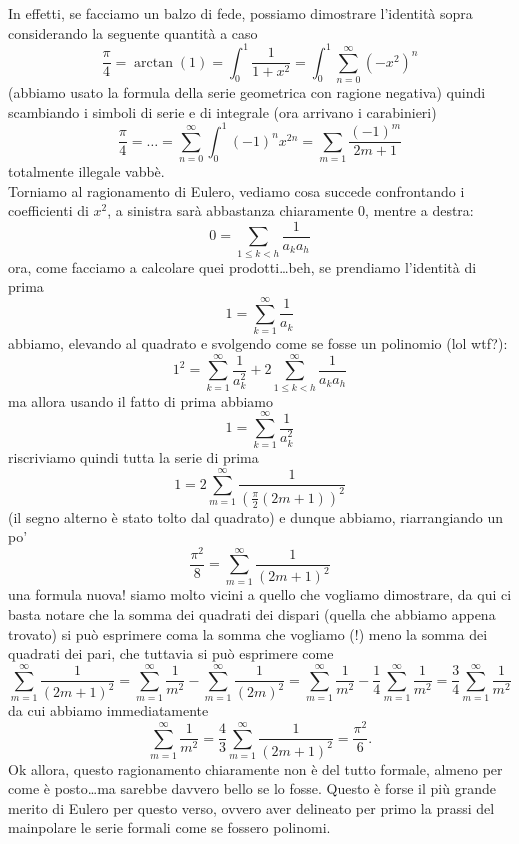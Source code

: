 \documentclass[11pt]{scrartcl}
\begin{document}
  In effetti, se facciamo un balzo di fede, possiamo dimostrare l'identità sopra considerando la seguente quantità a caso
  $$\frac{\pi}{4}=\arctan(1)=\int_0^1\frac{1}{1+x^2}=\int_0^1\sum_{n=0}^\infty(-x^2)^n$$ 
  (abbiamo usato la formula della serie geometrica con ragione negativa) quindi scambiando i simboli di serie e di integrale (ora arrivano i carabinieri)
  $$\frac{\pi}{4}=\dots=\sum_{n=0}^\infty\int_0^1(-1)^nx^{2n}=\sum_{m=1}\frac{(-1)^m}{2m+1}$$
  totalmente illegale vabbè. \\
  Torniamo al ragionamento di Eulero, vediamo cosa succede confrontando i coefficienti di $x^2$, a sinistra sarà abbastanza chiaramente $0$, mentre a destra:
  $$0=\sum_{1\le k<h}\frac{1}{a_ka_h}$$
  ora, come facciamo a calcolare quei prodotti\dots beh, se prendiamo l'identità di prima
  $$1=\sum_{k=1}^\infty\frac{1}{a_k}$$
  abbiamo, elevando al quadrato e svolgendo come se fosse un polinomio (lol wtf?):
  $$1^2=\sum_{k=1}^\infty\frac{1}{a_k^2}+2\sum_{1\le k < h}^\infty \frac{1}{a_ka_h}$$
  ma allora usando il fatto di prima abbiamo 
  $$1=\sum_{k=1}^\infty\frac{1}{a_k^2}$$
  riscriviamo quindi tutta la serie di prima
  $$1=2\sum_{m=1}^\infty\frac{1}{\left(\frac{\pi}{2}(2m+1)\right)^2}$$
  (il segno alterno è stato tolto dal quadrato) e dunque abbiamo, riarrangiando un po'
  $$\frac{\pi^2}{8}=\sum_{m=1}^\infty\frac{1}{(2m+1)^2}$$
  una formula nuova! siamo molto vicini a quello che vogliamo dimostrare, da qui ci basta notare che la somma dei quadrati dei dispari (quella che abbiamo appena trovato) si può esprimere coma la somma che vogliamo (!) meno la somma dei quadrati dei pari, che tuttavia si può esprimere come
  $$\sum_{m=1}^\infty\frac{1}{(2m+1)^2}=\sum_{m=1}^\infty \frac{1}{m^2}-\sum_{m=1}^\infty \frac{1}{(2m)^2}=\sum_{m=1}^\infty \frac{1}{m^2}-\frac{1}{4}\sum_{m=1}^\infty \frac{1}{m^2}=\frac{3}{4}\sum_{m=1}^\infty \frac{1}{m^2}$$
  da cui abbiamo immediatamente
  $$\sum_{m=1}^\infty \frac{1}{m^2}=\frac{4}{3}\sum_{m=1}^\infty\frac{1}{(2m+1)^2}=\frac{\pi^2}{6}.$$
  Ok allora, questo ragionamento chiaramente non è del tutto formale, almeno per come è posto\dots ma sarebbe davvero bello se lo fosse. Questo è forse il più grande merito di Eulero per questo verso, ovvero aver delineato per primo la prassi del mainpolare le serie formali come se fossero polinomi.
\end{document}
